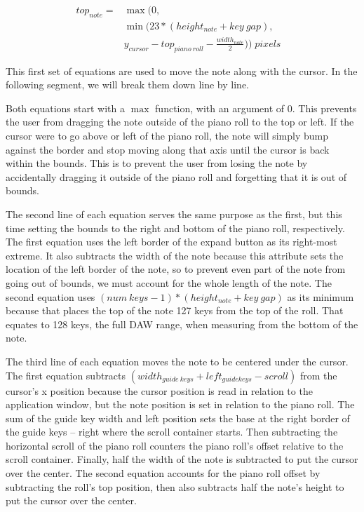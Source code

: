 \begin{align} \label{move_vert}
  top_{note} = & \max(0,                                                              \\
               & \min(23 * (height_{note} + key\:gap),                                \\
               & y_{cursor} - top_{piano\:roll} - \frac{width_{note}}{2})) \;pixels &
\end{align}

This first set of equations are used to move the note along with the cursor. In the following
segment, we will break them down line by line.

Both equations start with a $ \max $ function, with an argument of $ 0 $. This prevents the user from
dragging the note outside of the piano roll to the top or left. If the cursor were to go above or
left of the piano roll, the note will simply bump against the border and stop moving along that
axis until the cursor is back within the bounds. This is to prevent the user from losing the note
by accidentally dragging it outside of the piano roll and forgetting that it is out of bounds.

The second line of each equation serves the same purpose as the first, but this time setting the
bounds to the right and bottom of the piano roll, respectively. The first equation uses the left
border of the expand button as its right-most extreme. It also subtracts the width of the note
because this attribute sets the location of the left border of the note, so to prevent even part
of the note from going out of bounds, we must account for the whole length of the note. The second
equation uses $ (num\:keys - 1)*(height_{note} + key\: gap) $ as its minimum because that places the
top of the note 127 keys from the top of the roll. That equates to 128 keys, the full DAW range,
when measuring from the bottom of the note.

The third line of each equation moves the note to be centered under the cursor. The first equation
subtracts $ (width_{guide\:keys} + left_{guide keys} - scroll) $ from the cursor’s x position because
the cursor position is read in relation to the application window, but the note position is set in
relation to the piano roll. The sum of the guide key width and left position sets the base at the
right border of the guide keys -- right where the scroll container starts. Then subtracting the
horizontal scroll of the piano roll counters the piano roll’s offset relative to the scroll
container. Finally, half the width of the note is subtracted to put the cursor over the center. The
second equation accounts for the piano roll offset by subtracting the roll’s top position, then
also subtracts half the note’s height to put the cursor over the center.

